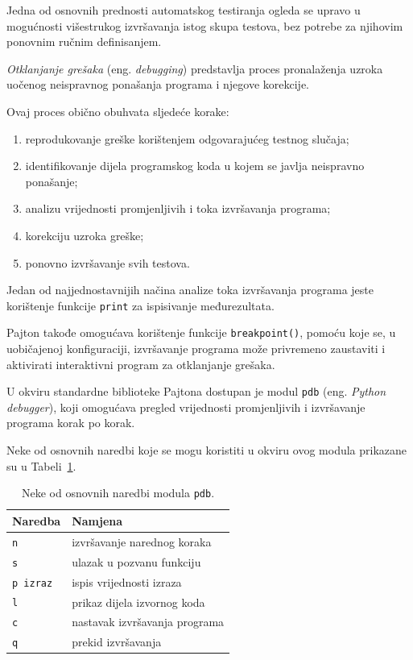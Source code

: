 Jedna od osnovnih prednosti automatskog testiranja 
ogleda se upravo u mogućnosti višestrukog izvršavanja 
istog skupa testova, bez potrebe za njihovim ponovnim 
ručnim definisanjem.

\textit{Otklanjanje grešaka} (eng. \emph{debugging}) 
predstavlja proces pronalaženja uzroka uočenog 
neispravnog ponašanja programa i njegove korekcije.

Ovaj proces obično obuhvata sljedeće korake:

\begin{enumerate}
	\item reprodukovanje greške korištenjem 
	odgovarajućeg testnog slučaja;
	
	\item identifikovanje dijela programskog koda 
	u kojem se javlja neispravno ponašanje;
	
	\item analizu vrijednosti promjenljivih i toka 
	izvršavanja programa;
	
	\item korekciju uzroka greške;
	
	\item ponovno izvršavanje svih testova.
\end{enumerate}

Jedan od najjednostavnijih načina analize toka 
izvršavanja programa jeste korištenje funkcije 
\texttt{print} za ispisivanje međurezultata.

Pajton takođe omogućava korištenje funkcije 
\texttt{breakpoint()}, pomoću koje se, u uobičajenoj 
konfiguraciji, izvršavanje programa može privremeno 
zaustaviti i aktivirati interaktivni program za 
otklanjanje grešaka.

U okviru standardne biblioteke Pajtona dostupan je 
modul \texttt{pdb} (eng. \emph{Python debugger}), 
koji omogućava pregled vrijednosti promjenljivih 
i izvršavanje programa korak po korak.

Neke od osnovnih naredbi koje se mogu koristiti 
u okviru ovog modula prikazane su u 
Tabeli~\ref{tab:pdb-naredbe}.

\begin{table}[ht]
	\centering
	\begin{tabular}{ll}
		\hline
		Naredba & Namjena \\ \hline
		\texttt{n} & izvršavanje narednog koraka \\
		\texttt{s} & ulazak u pozvanu funkciju \\
		\texttt{p izraz} & ispis vrijednosti izraza \\
		\texttt{l} & prikaz dijela izvornog koda \\
		\texttt{c} & nastavak izvršavanja programa \\
		\texttt{q} & prekid izvršavanja \\ \hline
	\end{tabular}
	\caption{Neke od osnovnih naredbi modula \texttt{pdb}.}
	\label{tab:pdb-naredbe}
\end{table}

